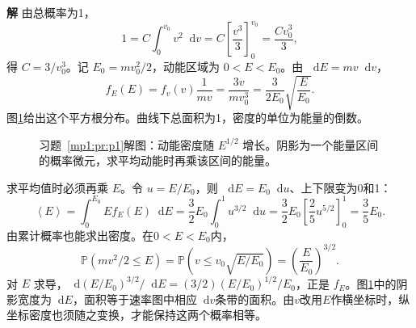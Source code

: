 \documentclass[11pt,openany,fontset=fandol]{ctexbook}
\theoremstyle{definition}\newtheorem{example}{例}[chapter]\newtheorem{exercise}{习题}[chapter]
\newcommand{\SolutionStart}{\par\medskip\ifdim\pagetotal>0pt\ifdim\dimexpr\pagegoal-\pagetotal\relax<3\baselineskip\newpage\fi\fi\noindent\textbf{解}\quad\ignorespaces}
\newenvironment{solution}{\SolutionStart}{\par\medskip}
\newcommand{\dd}{\mathop{}\!\mathrm d}\newcommand{\ee}{\mathrm e}\newcommand{\vct}[1]{\bm{#1}}
\newcommand{\Prob}{\mathbb P}\newcommand{\avg}[1]{\left\langle#1\right\rangle}
\begin{document}
\begin{solution}
由总概率为1，
\[
1=C\int_0^{v_0}v^2\dd v=C\left[\frac{v^3}{3}\right]_0^{v_0}
=\frac{Cv_0^3}{3},
\]
得 $C=3/v_0^3$。记 $E_0=mv_0^2/2$，动能区域为 $0<E<E_0$。由 $\dd E=mv\dd v$，
\[
f_E(E)=f_v(v)\frac1{mv}=\frac{3v}{mv_0^3}
=\frac3{2E_0}\sqrt{\frac E{E_0}}.
\]
图\ref{mp1:fig:p1-s}给出这个平方根分布。曲线下总面积为1，密度的单位为能量的倒数。

\begin{figure}[H]\centering

\caption{习题~\ref{mp1:pr:p1}解图：动能密度随 $E^{1/2}$ 增长。阴影为一个能量区间的概率微元，求平均动能时再乘该区间的能量。}\label{mp1:fig:p1-s}
\end{figure}

求平均值时必须再乘 $E$。令 $u=E/E_0$，则 $\dd E=E_0\dd u$、上下限变为0和1：
\[
\avg E=\int_0^{E_0}E f_E(E)\dd E
=\frac32 E_0\int_0^1u^{3/2}\dd u
=\frac32E_0\left[\frac25u^{5/2}\right]_0^1
=\frac35E_0.
\]
由累计概率也能求出密度。在$0<E<E_0$内，
\[
 \Prob(mv^2/2\le E)=\Prob\left(v\le v_0\sqrt{E/E_0}\right)
 =\left(\frac E{E_0}\right)^{3/2}.
\]
对 $E$ 求导，$\dd(E/E_0)^{3/2}/\dd E=(3/2)(E/E_0)^{1/2}/E_0$，正是 $f_E$。图\ref{mp1:fig:p1-s}中的阴影宽度为$\dd E$，面积等于速率图中相应$\dd v$条带的面积。由$v$改用$E$作横坐标时，纵坐标密度也须随之变换，才能保持这两个概率相等。
\end{solution}
\end{document}
